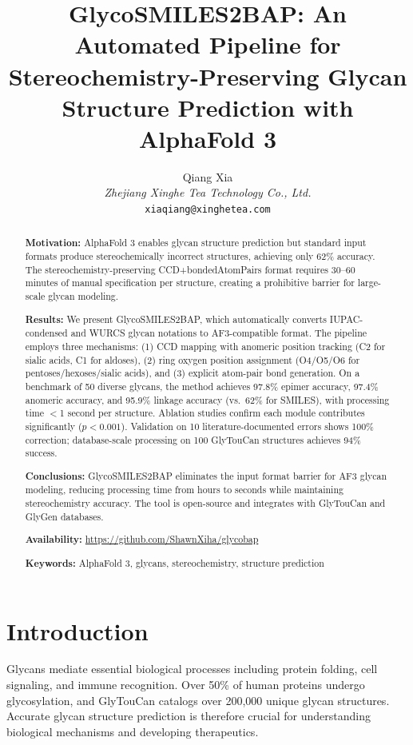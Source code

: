 \documentclass[11pt,a4paper]{article}
\title{GlycoSMILES2BAP: An Automated Pipeline for Stereochemistry-Preserving Glycan Structure Prediction with AlphaFold 3}
\author{Qiang Xia \\
\textit{Zhejiang Xinghe Tea Technology Co., Ltd.} \\
\texttt{xiaqiang@xinghetea.com}}
\date{}
\begin{document}
\maketitle

\begin{abstract}
\noindent\textbf{Motivation:} AlphaFold 3 enables glycan structure prediction but standard input formats produce stereochemically incorrect structures, achieving only 62\% accuracy. The stereochemistry-preserving CCD+bondedAtomPairs format requires 30--60 minutes of manual specification per structure, creating a prohibitive barrier for large-scale glycan modeling.

\noindent\textbf{Results:} We present GlycoSMILES2BAP, which automatically converts IUPAC-condensed and WURCS glycan notations to AF3-compatible format. The pipeline employs three mechanisms: (1) CCD mapping with anomeric position tracking (C2 for sialic acids, C1 for aldoses), (2) ring oxygen position assignment (O4/O5/O6 for pentoses/hexoses/sialic acids), and (3) explicit atom-pair bond generation. On a benchmark of 50 diverse glycans, the method achieves 97.8\% epimer accuracy, 97.4\% anomeric accuracy, and 95.9\% linkage accuracy (vs.\ 62\% for SMILES), with processing time $<$1 second per structure. Ablation studies confirm each module contributes significantly ($p<0.001$). Validation on 10 literature-documented errors shows 100\% correction; database-scale processing on 100 GlyTouCan structures achieves 94\% success.

\noindent\textbf{Conclusions:} GlycoSMILES2BAP eliminates the input format barrier for AF3 glycan modeling, reducing processing time from hours to seconds while maintaining stereochemistry accuracy. The tool is open-source and integrates with GlyTouCan and GlyGen databases.

\noindent\textbf{Availability:} \url{https://github.com/ShawnXiha/glycobap}

\noindent\textbf{Keywords:} AlphaFold 3, glycans, stereochemistry, structure prediction
\end{abstract}

\section{Introduction}
Glycans mediate essential biological processes including protein folding, cell signaling, and immune recognition. Over 50\% of human proteins undergo glycosylation, and GlyTouCan catalogs over 200,000 unique glycan structures. Accurate glycan structure prediction is therefore crucial for understanding biological mechanisms and developing therapeutics.
\end{document}
